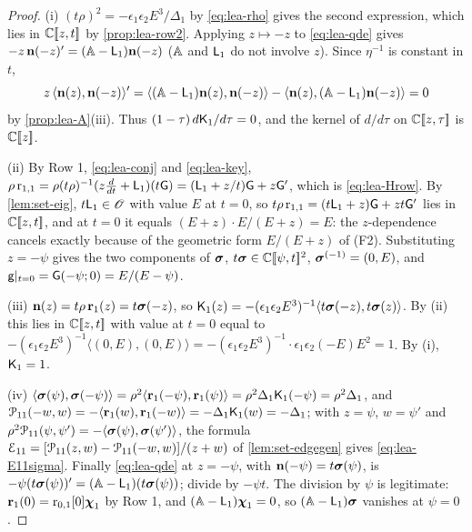\begin{proof}
(i) $(t\rho)^2 = -\epsilon_1\epsilon_2E^3/\Delta_1$ by \eqref{eq:lea-rho} gives the second expression, which lies in $\mathbb{C}[\![ z,t ]\!]$ by \cref{prop:lea-row2}. Applying $z\mapsto -z$ to \eqref{eq:lea-qde} gives $-z\,\mathbf{n}(-z)' = (\mathbb{A}-\mathsf{L}_1)\mathbf{n}(-z)$ ($\mathbb{A}$ and $\mathsf{L}_1$ do not involve $z$). Since $\eta^{-1}$ is constant in $t$,
\[
z\,\langle\mathbf{n}(z),\mathbf{n}(-z)\rangle' = \langle(\mathbb{A}-\mathsf{L}_1)\mathbf{n}(z),\mathbf{n}(-z)\rangle - \langle\mathbf{n}(z),(\mathbb{A}-\mathsf{L}_1)\mathbf{n}(-z)\rangle = 0
\]
by \cref{prop:lea-A}(iii). Thus $(1-\tau)\,d\mathsf{K}_{1}/d\tau = 0$, and the kernel of $d/d\tau$ on $\mathbb{C}[\![ z,\tau ]\!]$ is $\mathbb{C}[\![ z ]\!]$.

(ii) By Row 1, \eqref{eq:lea-conj} and \eqref{eq:lea-key}, $\rho\,\mathrm{r}_{1,1} = \rho(t\rho)^{-1}(z\frac{d}{dt}+\mathsf{L}_1)(t\mathsf{G}) = (\mathsf{L}_1 + z/t)\mathsf{G} + z\mathsf{G}'$, which is \eqref{eq:lea-Hrow}. By \cref{lem:set-eig}, $t\mathsf{L}_1\in\mathscr{O}$ with value $E$ at $t = 0$, so $t\rho\,\mathrm{r}_{1,1} = (t\mathsf{L}_1+z)\mathsf{G} + zt\mathsf{G}'$ lies in $\mathbb{C}[\![ z,t ]\!]$, and at $t = 0$ it equals $(E+z)\cdot E/(E+z) = E$: the $z$-dependence cancels exactly because of the geometric form $E/(E+z)$ of (F2). Substituting $z = -\psi$ gives the two components of $\boldsymbol{\sigma}$, $t\boldsymbol{\sigma}\in\mathbb{C}[\![ \psi,t ]\!]^2$, $\boldsymbol{\sigma}^{(-1)} = (0,E)$, and $\mathsf{g}|_{t=0} = \mathsf{G}(-\psi;0) = E/(E-\psi)$.

(iii) $\mathbf{n}(z) = t\rho\,\mathbf{r}_1(z) = t\boldsymbol{\sigma}(-z)$, so $\mathsf{K}_{1}(z) = -(\epsilon_1\epsilon_2E^3)^{-1}\langle t\boldsymbol{\sigma}(-z),t\boldsymbol{\sigma}(z)\rangle$. By (ii) this lies in $\mathbb{C}[\![ z,t ]\!]$ with value at $t = 0$ equal to $-(\epsilon_1\epsilon_2E^3)^{-1}\langle(0,E),(0,E)\rangle = -(\epsilon_1\epsilon_2E^3)^{-1}\cdot\epsilon_1\epsilon_2(-E)E^2 = 1$. By (i), $\mathsf{K}_{1} = 1$.

(iv) $\langle\boldsymbol{\sigma}(\psi),\boldsymbol{\sigma}(-\psi)\rangle = \rho^2\langle\mathbf{r}_1(-\psi),\mathbf{r}_1(\psi)\rangle = \rho^2\Delta_1\mathsf{K}_{1}(-\psi) = \rho^2\Delta_1$, and $\mathcal{P}_{11}(-w,w) = -\langle\mathbf{r}_1(w),\mathbf{r}_1(-w)\rangle = -\Delta_1\mathsf{K}_{1}(w) = -\Delta_1$; with $z = \psi$, $w = \psi'$ and $\rho^2\mathcal{P}_{11}(\psi,\psi') = -\langle\boldsymbol{\sigma}(\psi),\boldsymbol{\sigma}(\psi')\rangle$, the formula $\mathcal{E}_{11} = [\mathcal{P}_{11}(z,w) - \mathcal{P}_{11}(-w,w)]/(z+w)$ of \cref{lem:set-edgegen} gives \eqref{eq:lea-E11sigma}. Finally \eqref{eq:lea-qde} at $z = -\psi$, with $\mathbf{n}(-\psi) = t\boldsymbol{\sigma}(\psi)$, is $-\psi(t\boldsymbol{\sigma}(\psi))' = (\mathbb{A}-\mathsf{L}_1)(t\boldsymbol{\sigma}(\psi))$; divide by $-\psi t$. The division by $\psi$ is legitimate: $\mathbf{r}_1(0) = \mathrm{r}_{0,1}[0]\boldsymbol{\chi}_1$ by Row 1, and $(\mathbb{A}-\mathsf{L}_1)\boldsymbol{\chi}_1 = 0$, so $(\mathbb{A}-\mathsf{L}_1)\boldsymbol{\sigma}$ vanishes at $\psi = 0$.
\end{proof}

